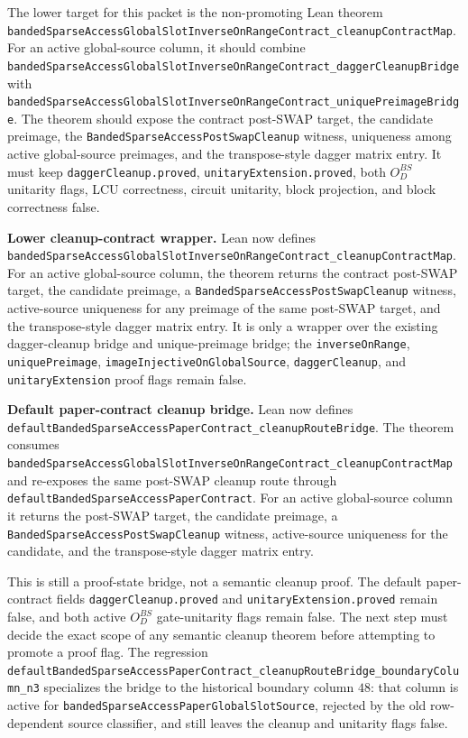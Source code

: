 The lower target for this packet is the non-promoting Lean theorem
\texttt{bandedSparseAccessGlobalSlotInverseOnRangeContract\_cleanupContractMap}.
For an active global-source column, it should combine
\texttt{bandedSparseAccessGlobalSlotInverseOnRangeContract\_daggerCleanupBridge}
with
\texttt{bandedSparseAccessGlobalSlotInverseOnRangeContract\_uniquePreimageBridge}.
The theorem should expose the contract post-SWAP target, the candidate
preimage, the \texttt{BandedSparseAccessPostSwapCleanup} witness, uniqueness
among active global-source preimages, and the transpose-style dagger matrix
entry.  It must keep \texttt{daggerCleanup.proved},
\texttt{unitaryExtension.proved}, both \(O_D^{BS}\) unitarity flags, LCU
correctness, circuit unitarity, block projection, and block correctness false.

\textbf{Lower cleanup-contract wrapper.}
Lean now defines
\texttt{bandedSparseAccessGlobalSlotInverseOnRangeContract\_cleanupContractMap}.
For an active global-source column, the theorem returns the contract
post-SWAP target, the candidate preimage, a
\texttt{BandedSparseAccessPostSwapCleanup} witness, active-source uniqueness
for any preimage of the same post-SWAP target, and the transpose-style dagger
matrix entry.  It is only a wrapper over the existing dagger-cleanup bridge
and unique-preimage bridge; the \texttt{inverseOnRange},
\texttt{uniquePreimage}, \texttt{imageInjectiveOnGlobalSource},
\texttt{daggerCleanup}, and \texttt{unitaryExtension} proof flags remain
false.

\textbf{Default paper-contract cleanup bridge.}
Lean now defines
\texttt{defaultBandedSparseAccessPaperContract\_cleanupRouteBridge}.  The
theorem consumes
\texttt{bandedSparseAccessGlobalSlotInverseOnRangeContract\_cleanupContractMap}
and re-exposes the same post-SWAP cleanup route through
\texttt{defaultBandedSparseAccessPaperContract}.  For an active global-source
column it returns the post-SWAP target, the candidate preimage, a
\texttt{BandedSparseAccessPostSwapCleanup} witness, active-source uniqueness
for the candidate, and the transpose-style dagger matrix entry.

This is still a proof-state bridge, not a semantic cleanup proof.  The default
paper-contract fields \texttt{daggerCleanup.proved} and
\texttt{unitaryExtension.proved} remain false, and both active \(O_D^{BS}\)
gate-unitarity flags remain false.  The next step must decide the exact scope
of any semantic cleanup theorem before attempting to promote a proof flag.
The regression
\texttt{defaultBandedSparseAccessPaperContract\_cleanupRouteBridge\_boundaryColumn\_n3}
specializes the bridge to the historical boundary column \(48\): that column
is active for \texttt{bandedSparseAccessPaperGlobalSlotSource}, rejected by the
old row-dependent source classifier, and still leaves the cleanup and unitarity
flags false.

